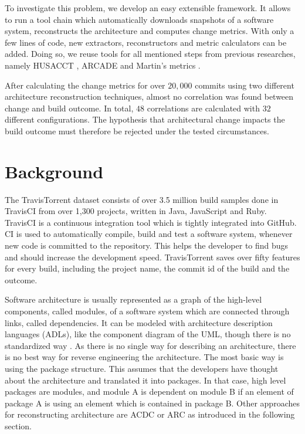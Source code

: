 \documentclass[conference]{IEEEtran}
\begin{document}
To investigate this problem, we develop an easy extensible framework. It allows to run a tool chain which automatically downloads snapshots of a software system, reconstructs the architecture and computes change metrics. With only a few lines of code, new extractors, reconstructors and metric calculators can be added. Doing so, we reuse tools for all mentioned steps from previous researches, namely HUSACCT \cite{Husacct1}, ARCADE \cite{Arcade} and Martin's metrics \cite{martinsMetrics}.

After calculating the change metrics for over $20,000$ commits using two different architecture reconstruction techniques, almost no correlation was found between change and build outcome. In total, $48$ correlations are calculated with $32$ different configurations. The hypothesis that architectural change impacts the build outcome must therefore be rejected under the tested circumstances. 

\section{Background}

The TravisTorrent dataset \cite{TravisTorrent} consists of over 3.5 million build samples done in TravisCI from over 1,300 projects, written in Java, JavaScript and Ruby. TravisCI is a continuous integration tool which is tightly integrated into GitHub. CI is used to automatically compile, build and test a software system, whenever new code is committed to the repository. This helps the developer to find bugs and should increase the development speed. 
TravisTorrent saves over fifty features for every build, including the project name, the commit id of the build and the outcome.

Software architecture is usually represented as a graph of the high-level components, called modules, of a software system which are connected through links, called dependencies. It can be modeled with architecture description languages (ADLs), like the component diagram of the UML, though there is no standardized way \cite{UML-Arch}. 
As there is no single way for describing an architecture, there is no best way for reverse engineering the architecture. The most basic way is using the package structure. This assumes that the developers have thought about the architecture and translated it into packages. In that case, high level packages are modules, and module A is dependent on module B if an element of package A is using an element which is contained in package B.
Other approaches for reconstructing architecture are ACDC or ARC as introduced in the following section.
\end{document}
